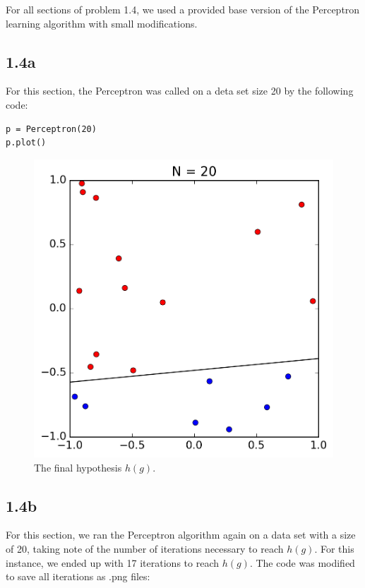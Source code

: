 \documentclass[11pt]{article}
\begin{document}
For all sections of problem 1.4, we used a provided base version of the Perceptron learning algorithm with small modifications.

\subsection*{1.4a}

For this section, the Perceptron was called on a deta set size 20 by the following code:

\begin{lstlisting}[frame=single]
p = Perceptron(20)
p.plot()
\end{lstlisting}

\begin{figure}[!htb]
	\includegraphics{14a.png}
	\caption{The final hypothesis $h(g)$.}
\end{figure}
\newpage

\subsection*{1.4b}

For this section, we ran the Perceptron algorithm again on a data set with a size of 20, taking note of the number of iterations necessary to reach $h(g)$. For this instance, we ended up with 17 iterations to reach $h(g)$.
The code was modified to save all iterations as .png files:
\end{document}
